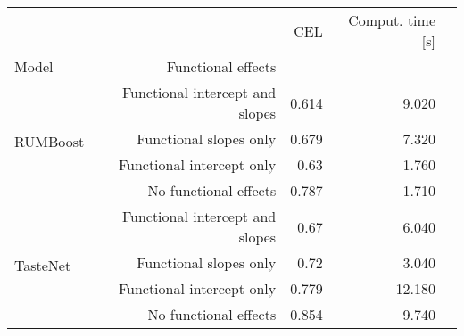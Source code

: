 \begin{tabular}{lrrrr}
\toprule
 &  & CEL & Comput. time [s] \\
Model & Functional effects &  &  \\
\midrule
\multirow[t]{4}{*}{RUMBoost} & Functional intercept and slopes & 0.614 & 9.020 \\
 & Functional slopes only & 0.679 & 7.320 \\
 & Functional intercept only & 0.63 & 1.760 \\
 & No functional effects & 0.787 & 1.710 \\
\cline{1-4}
\multirow[t]{4}{*}{TasteNet} & Functional intercept and slopes & 0.67 & 6.040 \\
 & Functional slopes only & 0.72 & 3.040 \\
 & Functional intercept only & 0.779 & 12.180 \\
 & No functional effects & 0.854 & 9.740 \\
\cline{1-4}
\bottomrule
\end{tabular}
